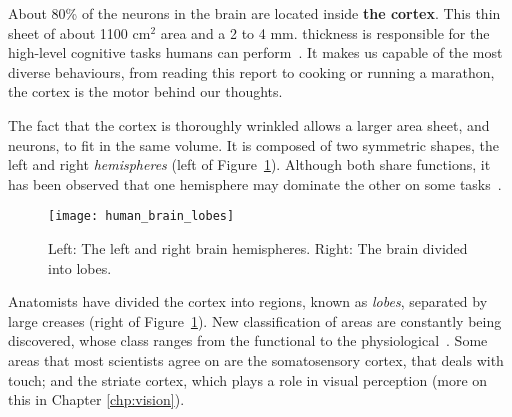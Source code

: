 About 80\% of the neurons in the brain are located inside \textbf{the cortex}. This thin sheet of about 1100 cm$^2$ area and a 2 to 4 mm. thickness is responsible for the high-level cognitive tasks humans can perform~\cite{thompson2000brain}. It makes us capable of the most diverse behaviours, from reading this report to cooking or running a marathon, the cortex is the motor behind our thoughts. 

The fact that the cortex is thoroughly wrinkled allows a larger area sheet, and neurons, to fit in the same volume. It is composed of two symmetric shapes, the left and right \emph{hemispheres} (left of Figure~\ref{fig:brain:hemi-lobes}). Although both share functions, it has been observed that one hemisphere may dominate the other on some tasks~\cite{lateralization}. 

\begin{figure}[hbt]
  \begin{center}
    \texttt{[image: human\_brain\_lobes]}
    \caption{Left: The left and right brain hemispheres. Right: The brain divided into lobes.}
    \label{fig:brain:hemi-lobes}
  \end{center}
\end{figure}

Anatomists have divided the cortex into regions, known as \emph{lobes},  separated by large creases (right of Figure~\ref{fig:brain:hemi-lobes}). New classification of areas are constantly being discovered, whose class ranges from the functional to the physiological~\cite{eye-brain-vision-hubel1995}. Some areas that most scientists agree on are the somatosensory cortex, that deals with touch; and the striate cortex, which plays a role in visual perception (more on this in Chapter \ref{chp:vision}).


